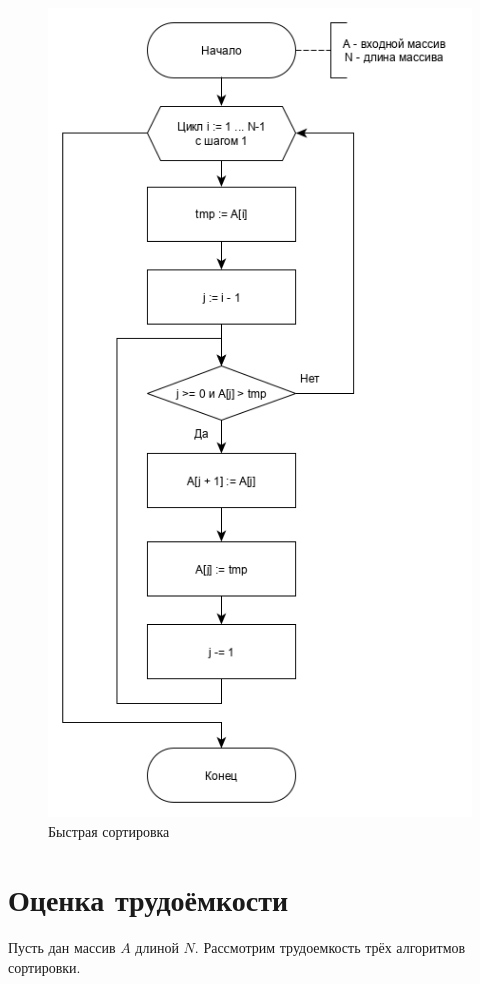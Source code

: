 \documentclass[12pt, a4paper]{report}
\begin{document}
	\begin{figure}[ht!]
		\centering
		\includegraphics[scale=0.8]{insert.png}
		\caption{Быстрая сортировка}
		\label{pic:quick}
	\end{figure}

	\newpage

	\section{Оценка трудоёмкости}
	Пусть дан массив $A$ длиной $N$. Рассмотрим трудоемкость трёх алгоритмов сортировки.
	
\end{document}
